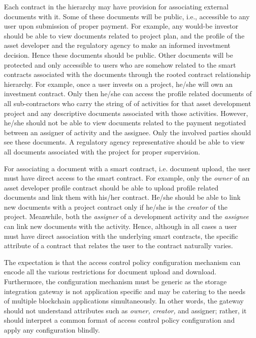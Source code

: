 Each contract in the hierarchy may have provision for associating external documents with it. Some of these documents will be public, i.e., accessible to any user upon submission of proper payment. For example, any would-be investor should be able to view documents related to project plan, and the profile of the asset developer and the regulatory agency to make an informed investment decision. Hence these documents should be public. Other documents will be protected and only accessible to users who are somehow related to the smart contracts associated with the documents through the rooted contract relationship hierarchy. For example, once a user invests on a project, he/she will own an investment contract. Only then he/she can access the profile related documents of all sub-contractors who carry the string of of activities for that asset development project and any descriptive documents associated with those activities. However, he/she should not be able to view documents related to the payment negotiated between an assigner of activity and the assignee. Only the involved parties should see these documents. A regulatory agency representative should be able to view all documents associated with the project for proper supervision.    

For associating a document with a smart contract, i.e. document upload, the user must have direct access to the smart contract. For example, only the {\it owner} of an asset developer profile contract should be able to upload profile related documents and link them with his/her contract. He/she should be able to link new documents with a project contract only if he/she is the {\it creator} of the project. Meanwhile, both the {\it assigner} of a development activity and the {\it assignee} can link new documents with the activity. Hence, although in all cases a user must have direct association with the underlying smart contracts, the specific attribute of a contract that relates the user to the contract naturally varies.   

The expectation is that the access control policy configuration mechanism can encode all the various restrictions for document upload and download. Furthermore, the configuration mechanism must be generic as the storage integration gateway is not application specific and may be catering to the needs of multiple blockchain applications simultaneously. In other words, the gateway should not understand attributes such as {\it owner, creator,} and {assigner}; rather, it should interpret a common format of access control policy configuration and apply any configuration blindly.      
 
